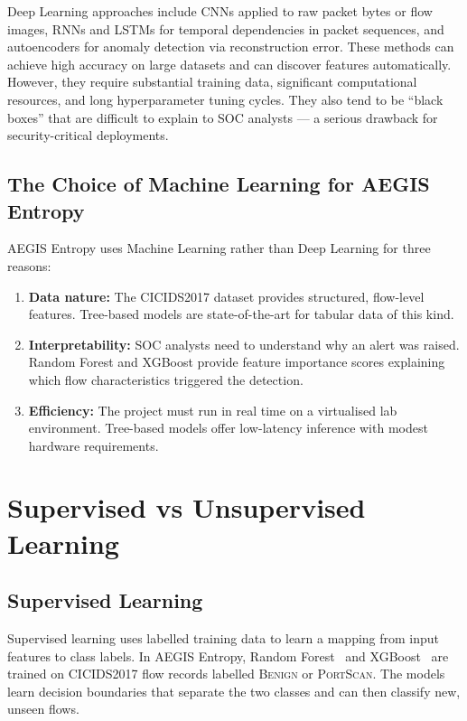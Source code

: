 \documentclass[12pt,a4paper]{report}
\begin{document}
Deep Learning approaches include CNNs applied to raw packet bytes or flow images, RNNs and LSTMs for temporal dependencies in packet sequences, and autoencoders for anomaly detection via reconstruction error. These methods can achieve high accuracy on large datasets and can discover features automatically. However, they require substantial training data, significant computational resources, and long hyperparameter tuning cycles. They also tend to be ``black boxes'' that are difficult to explain to SOC analysts --- a serious drawback for security-critical deployments.

\subsection{The Choice of Machine Learning for AEGIS Entropy}

AEGIS Entropy uses Machine Learning rather than Deep Learning for three reasons:

\begin{enumerate}
    \item \textbf{Data nature:} The CICIDS2017 dataset provides structured, flow-level features. Tree-based models are state-of-the-art for tabular data of this kind.
    \item \textbf{Interpretability:} SOC analysts need to understand why an alert was raised. Random Forest and XGBoost provide feature importance scores explaining which flow characteristics triggered the detection.
    \item \textbf{Efficiency:} The project must run in real time on a virtualised lab environment. Tree-based models offer low-latency inference with modest hardware requirements.
\end{enumerate}

\section{Supervised vs Unsupervised Learning}

\subsection{Supervised Learning}

Supervised learning uses labelled training data to learn a mapping from input features to class labels. In AEGIS Entropy, Random Forest~\cite{breiman2001} and XGBoost~\cite{chen2016} are trained on CICIDS2017 flow records labelled \textsc{Benign} or \textsc{PortScan}. The models learn decision boundaries that separate the two classes and can then classify new, unseen flows.
\end{document}

